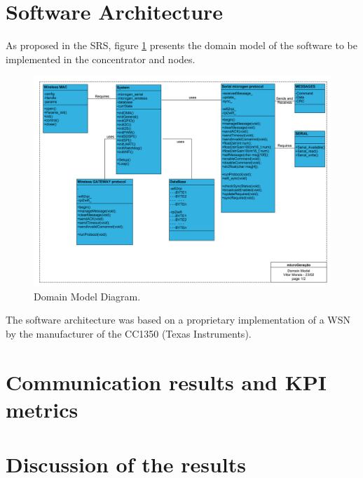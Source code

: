 \section{Software Architecture}
\label{sec:3.3}

As proposed in the SRS, figure \ref{fig:3.3.domainModel} presents the domain model of the software to be implemented in the concentrator and nodes.

\begin{figure}[h!]
	\centering
	\includegraphics[width=\textwidth,keepaspectratio]{figures/domainModel}
	\caption{Domain Model Diagram.}
	\label{fig:3.3.domainModel}
\end{figure}

The software architecture was based on a proprietary implementation of a WSN by the manufacturer of the CC1350 (Texas Instruments).



\section{Communication results and KPI metrics}
\label{sec:3.4}
\lipsum[4-4]

\section{Discussion of the results}
\label{sec:3.5}
\lipsum[4-4]